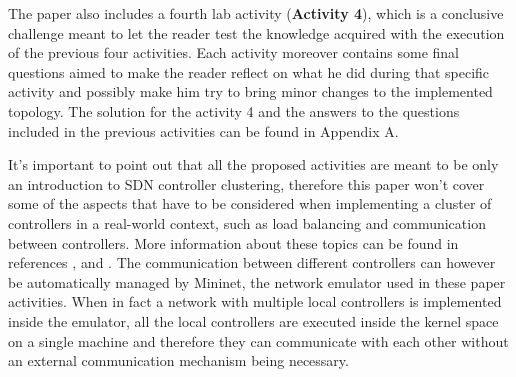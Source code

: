 \documentclass[12pt, a4paper]{article}
\begin{document}
The paper also includes a fourth lab activity (\textbf{Activity 4}), which is a conclusive challenge meant
to let the reader test the knowledge acquired with the execution of the previous
four activities. Each activity moreover contains some final questions aimed to make the reader
reflect on what he did during that specific activity and possibly make him try to
bring minor changes to the implemented topology. The solution for the activity 4
and the answers to the questions included in the previous activities can be
found in Appendix A.

It's important to point out that all the proposed activities are meant to be
only an introduction to SDN controller clustering, therefore this paper won't cover
some of the aspects that have to be considered when implementing a cluster of
controllers in a real-world context, such as load balancing and communication
between controllers. More information about these topics can be found in references
\cite{ref-2}, \cite{ref-1} and \cite{ref-9}.
The communication between different controllers can however be automatically managed
by Mininet, the network emulator used in these paper activities. When in fact a
network with multiple local controllers is implemented inside the emulator, all
the local controllers are executed inside the kernel space on a single machine
and therefore they can communicate with each other without an external
communication mechanism being necessary.








\clearpage
\printbibliography
\end{document}

